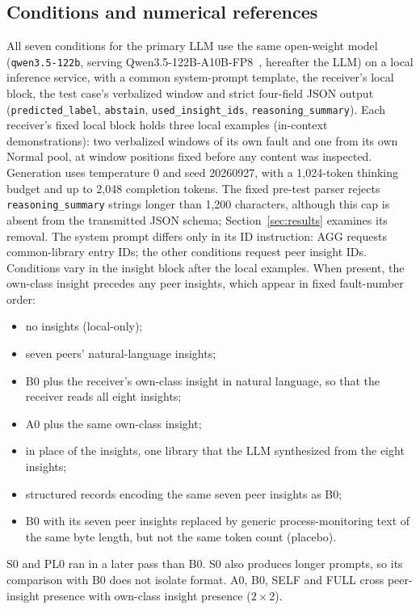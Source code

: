\documentclass[conference]{IEEEtran}
\newcommand{\cond}[1]{\textsf{#1}}
\begin{document}
\subsection{Conditions and numerical references}
\label{sec:conditions}
All seven conditions for the primary LLM use the same open-weight model (\texttt{qwen3.5-122b}, serving Qwen3.5-122B-A10B-FP8~\cite{qwen2026model}, hereafter the LLM) on a local inference service, with a common system-prompt template, the receiver's local block, the test case's verbalized window and strict four-field JSON output (\texttt{predicted\_label}, \texttt{abstain}, \texttt{used\_insight\_ids}, \texttt{reasoning\_summary}). Each receiver's fixed local block holds three local examples (in-context demonstrations): two verbalized windows of its own fault and one from its own Normal pool, at window positions fixed before any content was inspected. Generation uses temperature 0 and seed 20260927, with a 1,024-token thinking budget and up to 2,048 completion tokens. The fixed pre-test parser rejects \texttt{reasoning\_summary} strings longer than 1,200 characters, although this cap is absent from the transmitted JSON schema; Section~\ref{sec:results} examines its removal. The system prompt differs only in its ID instruction: \cond{AGG} requests common-library entry IDs; the other conditions request peer insight IDs. Conditions vary in the insight block after the local examples. When present, the own-class insight precedes any peer insights, which appear in fixed fault-number order:
\begin{itemize}[\IEEEsetlabelwidth{\cond{FULL}}]
\item[\cond{A0}] no insights (local-only);
\item[\cond{B0}] seven peers' natural-language insights;
\item[\cond{FULL}] \cond{B0} plus the receiver's own-class insight in natural language, so that the receiver reads all eight insights;
\item[\cond{SELF}] \cond{A0} plus the same own-class insight;
\item[\cond{AGG}] in place of the insights, one library that the LLM synthesized from the eight insights;
\item[\cond{S0}] structured records encoding the same seven peer insights as \cond{B0};
\item[\cond{PL0}] \cond{B0} with its seven peer insights replaced by generic process-monitoring text of the same byte length, but not the same token count (placebo).
\end{itemize}
\cond{S0} and \cond{PL0} ran in a later pass than \cond{B0}. \cond{S0} also produces longer prompts, so its comparison with \cond{B0} does not isolate format. \cond{A0}, \cond{B0}, \cond{SELF} and \cond{FULL} cross peer-insight presence with own-class insight presence ($2\times2$).
\end{document}
